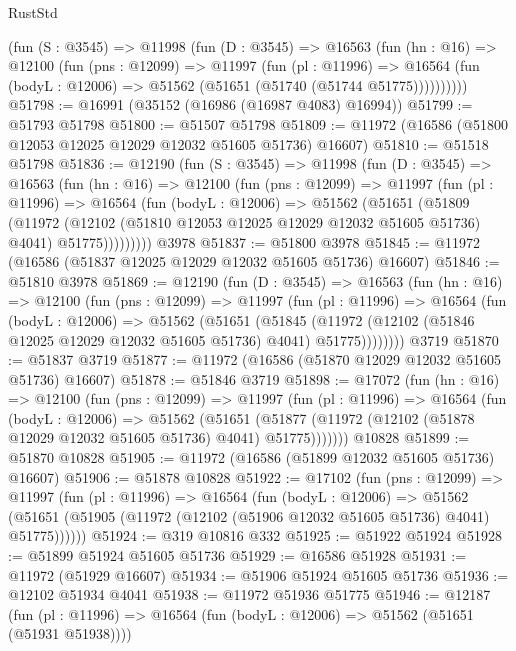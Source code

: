 \begin{lexlean}{RustStd}
\begin{coremodule}
      (fun (S : @3545) =>
      @11998
        (fun (D : @3545) =>
        @16563
          (fun (hn : @16) =>
          @12100
            (fun (pns : @12099) =>
            @11997
              (fun (pl : @11996) =>
              @16564 (fun (bodyL : @12006) => @51562 (@51651 (@51740 (@51744 @51775))))))))))
@51798 := @16991 (@35152 (@16986 (@16987 @4083) @16994))
@51799 := @51793 @51798
@51800 := @51507 @51798
@51809 := @11972 (@16586 (@51800 @12053 @12025 @12029 @12032 @51605 @51736) @16607)
@51810 := @51518 @51798
@51836 := @12190
    (fun (S : @3545) =>
    @11998
      (fun (D : @3545) =>
      @16563
        (fun (hn : @16) =>
        @12100
          (fun (pns : @12099) =>
          @11997
            (fun (pl : @11996) =>
            @16564
              (fun (bodyL : @12006) =>
              @51562
                (@51651
                  (@51809
                    (@11972
                      (@12102 (@51810 @12053 @12025 @12029 @12032 @51605 @51736) @4041)
                      @51775)))))))))
    @3978
@51837 := @51800 @3978
@51845 := @11972 (@16586 (@51837 @12025 @12029 @12032 @51605 @51736) @16607)
@51846 := @51810 @3978
@51869 := @12190
    (fun (D : @3545) =>
    @16563
      (fun (hn : @16) =>
      @12100
        (fun (pns : @12099) =>
        @11997
          (fun (pl : @11996) =>
          @16564
            (fun (bodyL : @12006) =>
            @51562
              (@51651
                (@51845
                  (@11972 (@12102 (@51846 @12025 @12029 @12032 @51605 @51736) @4041) @51775))))))))
    @3719
@51870 := @51837 @3719
@51877 := @11972 (@16586 (@51870 @12029 @12032 @51605 @51736) @16607)
@51878 := @51846 @3719
@51898 := @17072
    (fun (hn : @16) =>
    @12100
      (fun (pns : @12099) =>
      @11997
        (fun (pl : @11996) =>
        @16564
          (fun (bodyL : @12006) =>
          @51562
            (@51651
              (@51877 (@11972 (@12102 (@51878 @12029 @12032 @51605 @51736) @4041) @51775)))))))
    @10828
@51899 := @51870 @10828
@51905 := @11972 (@16586 (@51899 @12032 @51605 @51736) @16607)
@51906 := @51878 @10828
@51922 := @17102
    (fun (pns : @12099) =>
    @11997
      (fun (pl : @11996) =>
      @16564
        (fun (bodyL : @12006) =>
        @51562 (@51651 (@51905 (@11972 (@12102 (@51906 @12032 @51605 @51736) @4041) @51775))))))
@51924 := @319 @10816 @332
@51925 := @51922 @51924
@51928 := @51899 @51924 @51605 @51736
@51929 := @16586 @51928
@51931 := @11972 (@51929 @16607)
@51934 := @51906 @51924 @51605 @51736
@51936 := @12102 @51934 @4041
@51938 := @11972 @51936 @51775
@51946 := @12187
    (fun (pl : @11996) => @16564 (fun (bodyL : @12006) => @51562 (@51651 (@51931 @51938))))

\end{coremodule}
\end{lexlean}
